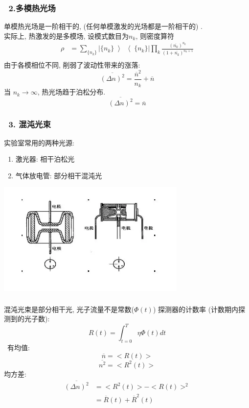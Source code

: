 \begin{frame} 
    \frametitle{~2.多模热光场}
    单模热光场是一阶相干的, (任何单模激发的光场都是一阶相干的) . \\
    实际上, 热激发的是多模场, 设模式数目为$n_k$, 则密度算符 
    \[ \begin{aligned}
        \rho &= \sum_{\{n_k\}} |\{n_k\} \left\rangle \right\langle \{n_k\} | \prod_k
        \frac{(\overline{n_k})^{n_k}}{(1+\overline{n_k})^{n_k+1}} \\
    \end{aligned}\] 
    由于各模相位不同, 削弱了波动性带来的涨落:
    \[ \overline{ (\Delta n)^2 } = \frac{\overline{ n }^2}{n_k} + \overline{ n } \] 
    当  $n_k \to \infty$, 热光场趋于泊松分布. \[ \overline{ (\Delta n)^2 } = \overline{ n }\] 
\end{frame}

\begin{frame} 
 \frametitle{~3. 混沌光束}
 实验室常用的两种光源:
 \begin{enumerate}
     \item 激光器: 相干泊松光
     \item 气体放电管: 部分相干混沌光
 \end{enumerate}
   \begin{center}
        \includegraphics[width=0.7\textwidth]{figs/2022-05-07-11-10-12.png}
   \end{center}
\end{frame}

\begin{frame}
 \frametitle{}
 混沌光束是部分相干光, 光子流量不是常数($\varPhi (t) $) 
 探测器的计数率 (计数期内探测到的光子数):  
    \[R(t)= \int _{t=0} ^ {T} \eta \varPhi (t)  dt\]
 有均值:
\[ \overline{n}  = < R(t)> \]
\[ \overline{n^2}  = < R^2 (t)> \]
均方差:
\[\begin{aligned}
    \overline{(\Delta n)^2} &= < R^2 (t)> - < R(t)>^2 \\ 
    &= \overline{R}(t)+\overline{R}^2(t)
\end{aligned}\]
\end{frame}

